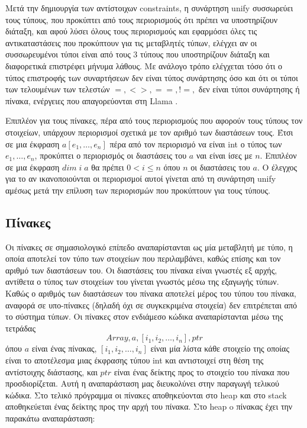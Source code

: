 \documentclass[12pt]{article}
\newcommand{\Llama}{\textsf{Llama }}
\begin{document}
Μετά την δημιουργία των αντίστοιχων constraints, η συνάρτηση unify συσσωρεύει τους τύπους, που προκύπτει από τους περιορισμούς ότι πρέπει να υποστηρίζουν διάταξη, και αφού λύσει όλους τους περιορισμούς και εφαρμόσει όλες τις αντικαταστάσεις που προκύπτουν για τις μεταβλητές τύπων, ελέγχει αν οι συσσωρευμένοι τύποι είναι από τους 3 τύπους που υποστηρίζουν διάταξη και διαφορετικά επιστρέφει μήνυμα λάθους. Με ανάλογο τρόπο ελέγχεται τόσο ότι ο τύπος επιστροφής των συναρτήσεων δεν είναι τύπος συνάρτησης όσο και ότι οι τύποι των τελουμένων των τελεστών $=,<>,==,!=,$ δεν είναι τύποι συνάρτησης ή πίνακα, ενέργειες που απαγορεύονται στη \Llama. 

Επιπλέον για τους πίνακες, πέρα από τους περιορισμούς που αφορούν τους τύπους τον στοιχείων, υπάρχουν περιορισμοί σχετικά με τον αριθμό των διαστάσεων τους. Έτσι σε μια έκφραση $a[e_1, \ldots, e_n]$ πέρα από τον περιορισμό να είναι int ο τύπος των $e_1, \ldots, e_n$, προκύπτει ο περιορισμός οι διαστάσεις του $a$ ναι είναι ίσες με $n$. Επιπλέον σε μια έκφραση $dim \; i \; a$ θα πρέπει $0 < i \leq n$ όπου $n$ οι διαστάσεις του $a$. Ο έλεγχος για το αν ικανοποιούνται οι περιορισμοί αυτοί γίνεται από τη συνάρτηση unify αμέσως μετά την επίλυση των περιορισμών που προκύπτουν για τους τύπους.

\subsection{Πίνακες}
Οι πίνακες σε σημασιολογικό επίπεδο αναπαρίστανται ως μία μεταβλητή με τύπο, η οποία αποτελεί τον τύπο των στοιχείων που περιλαμβάνει, καθώς επίσης και τον αριθμό των διαστάσεων του. Οι διαστάσεις του πίνακα είναι γνωστές εξ αρχής, αντίθετα ο τύπος των στοιχείων του γίνεται γνωστός μέσω της εξαγωγής τύπων. Καθώς ο αριθμός των διαστάσεων του πίνακα αποτελεί μέρος του τύπου του πίνακα, αναφορά σε υπο-πίνακες (δηλαδή όχι σε συγκεκριμένα στοιχεία) δεν επιτρέπεται από το σύστημα τύπων.
Οι πίνακες στον ενδιάμεσο κώδικα αναπαρίστανται μέσω της τετράδας $$Array, a, [i_1,i_2, \ldots, i_n], ptr$$ όπου $a$ είναι ένας πίνακας, $[i_1, i_2, \ldots, i_n]$ είναι μία λίστα κάθε στοιχείο της οποίας είναι το αποτέλεσμα μιας έκφρασης τύπου int και αντιστοιχεί στη θέση της αντίστοιχης διάστασης, και $ptr$ είναι ένας δείκτης προς το στοιχείο του πίνακα που προσδιορίζεται.  Αυτή η αναπαράσταση μας διευκολύνει στην παραγωγή τελικού κώδικα. Στο τελικό πρόγραμμα οι πίνακες αποθηκεύονται στο heap και στο stack αποθηκεύεται ένας δείκτης προς την αρχή του πίνακα. Στο heap o πίνακας έχει την παρακάτω αναπαράσταση:
\end{document}
